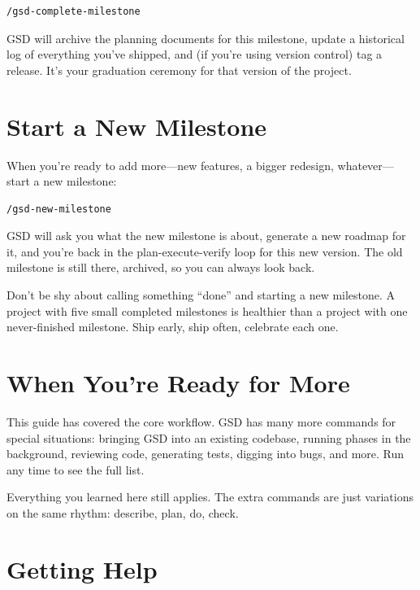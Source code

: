 \documentclass[11pt,letterpaper,openany]{book}
\begin{document}
\begin{lstlisting}
/gsd-complete-milestone
\end{lstlisting}

GSD will archive the planning documents for this milestone, update
a historical log of everything you've shipped, and (if you're using
version control) tag a release. It's your graduation ceremony for
that version of the project.

\section{Start a New Milestone}

When you're ready to add more---new features, a bigger redesign,
whatever---start a new milestone:

\begin{lstlisting}
/gsd-new-milestone
\end{lstlisting}

GSD will ask you what the new milestone is about, generate a new
roadmap for it, and you're back in the plan-execute-verify loop for
this new version. The old milestone is still there, archived, so
you can always look back.

\begin{gsdtip}
Don't be shy about calling something ``done'' and starting a new
milestone. A project with five small completed milestones is healthier
than a project with one never-finished milestone. Ship early, ship
often, celebrate each one.
\end{gsdtip}

\section{When You're Ready for More}

This guide has covered the core workflow. GSD has many more commands
for special situations: bringing GSD into an existing codebase,
running phases in the background, reviewing code, generating tests,
digging into bugs, and more. Run  any time to see the
full list.

Everything you learned here still applies. The extra commands are
just variations on the same rhythm: describe, plan, do, check.

\section{Getting Help}
\end{document}
